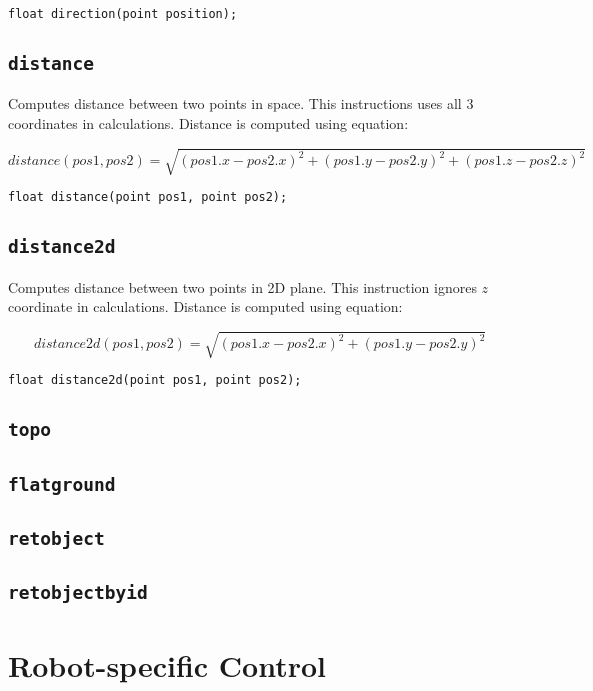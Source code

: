 \begin{lstlisting}
float direction(point position);
\end{lstlisting}


\subsection{\texttt{distance}}
Computes distance between two points in space. This instructions uses all 3 coordinates in calculations. Distance is computed using equation:

\[
distance(pos1, pos2) = \sqrt{(pos1.x - pos2.x)^2 + (pos1.y - pos2.y)^2 + (pos1.z - pos2.z)^2}
\]

\begin{lstlisting}
float distance(point pos1, point pos2);
\end{lstlisting}


\subsection{\texttt{distance2d}}
Computes distance between two points in 2D plane. This instruction ignores $z$ coordinate in calculations. Distance is computed using equation:

\[
distance2d(pos1, pos2) = \sqrt{(pos1.x - pos2.x)^2 + (pos1.y - pos2.y)^2}
\]

\begin{lstlisting}
float distance2d(point pos1, point pos2);
\end{lstlisting}


\subsection{\texttt{topo}}
\subsection{\texttt{flatground}}
\subsection{\texttt{retobject}}
\subsection{\texttt{retobjectbyid}}


\section{Robot-specific Control}

